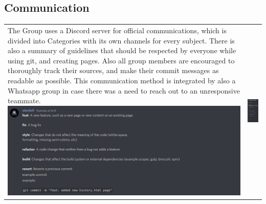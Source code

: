 \documentclass[12pt]{article}
\begin{document}
 \subsection{Communication}
\begin{tabular}{p{12.3cm} p{4.7cm}}
 The Group uses a Discord server for official communications, which is divided into Categories with its own channels for every subject. There is also a summary of guidelines that should be respected by everyone while using git, and creating pages. Also all group members are encouraged to thoroughly track their sources, and make their commit messages as readable as possible. This communication method is integrated by also a Whatsapp group in case there was a need to reach out to an unresponsive teammate. 
 \newline\newline
  \includegraphics[scale=0.338]{Git_comments.png}
 &
 \vspace{-0.5cm}
 \begin{flushright}
\includegraphics[scale=0.54]{DiscordServer.png}

\end{flushright}
\end{tabular}
\end{document}

